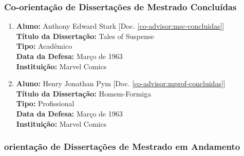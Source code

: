 \documentclass[a4paper,oneside,12pt]{article}
\begin{document}

\subsubsection{Co-orientação de Dissertações de Mestrado Concluídas}
\vspace{0.3cm}

\begin{enumerate}
\renewcommand{\labelenumi}{{\large\bfseries\arabic{enumi}.}}

\item       \textbf{Aluno:} Anthony Edward Stark [Doc. \ref{co-advisor:msc-concluidas}] \\
            \textbf{Título da Dissertação:} Tales of Suspense\\
            \textbf{Tipo:} Acadêmico \\%
            \textbf{Data da Defesa:} Março de 1963 \\
            \textbf{Instituição:} Marvel Comics

\item       \textbf{Aluno:} Henry Jonathan Pym [Doc. \ref{co-advisor:mprof-concluidas}] \\
            \textbf{Título da Dissertação:} Homem-Formiga\\
            \textbf{Tipo:} Profissional\\
            \textbf{Data da Defesa:} Março de 1963 \\
            \textbf{Instituição:} Marvel Comics

\end{enumerate}


\subsubsection{orientação de Dissertações de Mestrado em Andamento}
\vspace{0.3cm}
\end{document}
